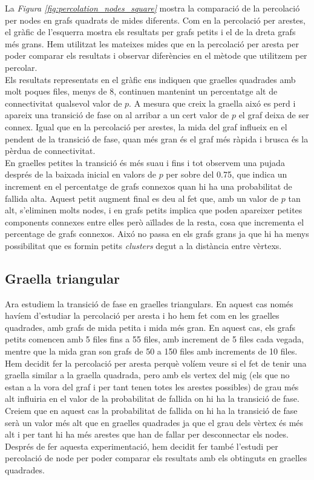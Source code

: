 \documentclass[a4paper]{article}
\begin{document}
	La \textit{Figura \ref{fig:percolation_nodes_square}} mostra la comparació de la percolació per nodes en grafs quadrats de mides diferents. Com en la percolació per arestes, el gràfic de l'esquerra mostra els resultats per grafs petits i el de la dreta grafs més grans. Hem utilitzat les mateixes mides que en la percolació per aresta per poder comparar els resultats i observar diferències en el mètode que utilitzem per percolar. \\
	
	Els resultats representats en el gràfic ens indiquen que graelles quadrades amb molt poques files, menys de 8, continuen mantenint un percentatge alt de connectivitat qualsevol valor de $p$. A mesura que creix la graella aixó es perd i apareix una transició de fase on al arribar a un cert valor de $p$ el graf deixa de ser connex. Igual que en la percolació per arestes, la mida del graf influeix en el pendent de la transició de fase, quan més gran és el graf més ràpida i brusca és la pèrdua de connectivitat. \\
	
	En graelles petites la transició és més suau i fins i tot observem una pujada després de la baixada inicial en valors de $p$ per sobre del 0.75, que indica un increment en el percentatge de grafs connexos quan hi ha una probabilitat de fallida alta. Aquest petit augment final es deu al fet que, amb un valor de $p$ tan alt, s'eliminen molts nodes, i en grafs petits implica que poden apareixer petites components connexes entre elles però aïllades de la resta, cosa que incrementa el percentage de grafs connexos. Aixó no passa en els grafs grans ja que hi ha menys possibilitat que es formin petits \textit{clusters} degut a la distància entre vèrtexs.
	
	
	\subsection{Graella triangular}
	
	Ara estudiem la transició de fase en graelles triangulars. En aquest cas només havíem d'estudiar la percolació per aresta i ho hem fet com en les graelles quadrades, amb grafs de mida petita i mida més gran. En aquest cas, els grafs petits comencen amb 5 files fins a 55 files, amb increment de 5 files cada vegada, mentre que la mida gran son grafs de 50 a 150 files amb increments de 10 files. \\
	
	Hem decidit fer la percolació per aresta perquè volíem veure si el fet de tenir una graella similar a la graella quadrada, pero amb els vertex del mig (els que no estan a la vora del graf i per tant tenen totes les arestes possibles) de grau més alt influiria en el valor de la probabilitat de fallida on hi ha la transició de fase. Creiem que en aquest cas la probabilitat de fallida on hi ha la transició de fase serà un valor més alt que en graelles quadrades ja que el grau dels vèrtex és més alt i per tant hi ha més arestes que han de fallar per desconnectar els nodes. Després de fer aquesta experimentació, hem decidit fer també l'estudi per percolació de node per poder comparar els resultats amb els obtinguts en graelles quadrades. \\
	
\end{document}
